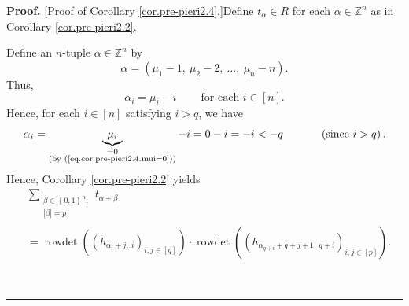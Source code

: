 \documentclass[numbers=enddot,12pt,final,onecolumn,notitlepage,english]{scrartcl}%
\theoremstyle{definition}
\newenvironment{proof}[1][Proof]{\noindent\textbf{#1.} }{\ \rule{0.5em}{0.5em}}
\let\sumnonlimits\sum
\renewcommand{\sum}{\sumnonlimits\limits}
\newenvironment{verlong}{}{}
\begin{document}
\begin{verlong}
\begin{proof}
[Proof of Corollary \ref{cor.pre-pieri2.4}.]Define $t_{\alpha}\in R$ for each
$\alpha\in\mathbb{Z}^{n}$ as in Corollary \ref{cor.pre-pieri2.2}.

Define an $n$-tuple $\alpha\in\mathbb{Z}^{n}$ by%
\[
\alpha=\left(  \mu_{1}-1,\ \mu_{2}-2,\ \ldots,\ \mu_{n}-n\right)  .
\]
Thus,%
\begin{equation}
\alpha_{i}=\mu_{i}-i\ \ \ \ \ \ \ \ \ \ \text{for each }i\in\left[  n\right]
. \label{pf.cor.pre-pieri2.4.ali=}%
\end{equation}
Hence, for each $i\in\left[  n\right]  $ satisfying $i>q$, we have%
\[
\alpha_{i}=\underbrace{\mu_{i}}_{\substack{=0\\\text{(by
(\ref{eq.cor.pre-pieri2.4.mui=0}))}}}-i=0-i=-i<-q\ \ \ \ \ \ \ \ \ \ \left(
\text{since }i>q\right)  .
\]
Hence, Corollary \ref{cor.pre-pieri2.2} yields
\begin{align}
&  \sum_{\substack{\beta\in\left\{  0,1\right\}  ^{n};\\\left\vert
\beta\right\vert =p}}t_{\alpha+\beta}\nonumber\\
&  =\operatorname*{rowdet}\left(  \left(  h_{\alpha_{i}+j,\ i}\right)
_{i,j\in\left[  q\right]  }\right)  \cdot\operatorname*{rowdet}\left(  \left(
h_{\alpha_{q+i}+q+j+1,\ q+i}\right)  _{i,j\in\left[  p\right]  }\right)  .
\label{pf.cor.pre-pieri2.4.old}%
\end{align}



\end{proof}
\end{verlong}
\end{document}
